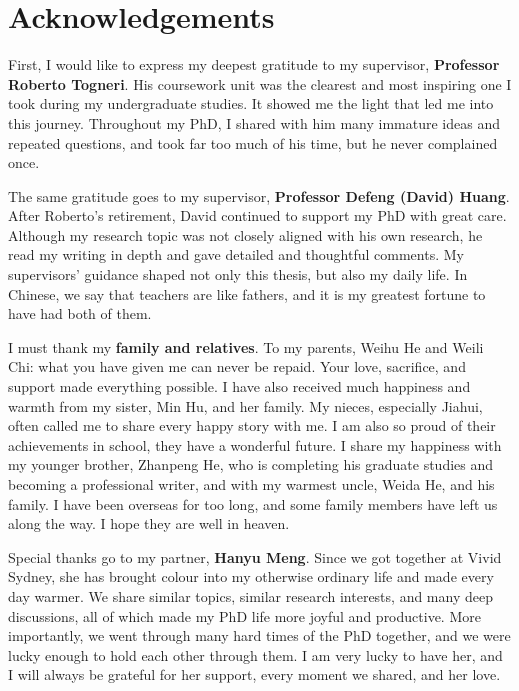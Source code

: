 \chapter*{\Large Acknowledgements}

First, I would like to express my deepest gratitude to my supervisor, \textbf{Professor Roberto Togneri}. His coursework unit was the clearest and most inspiring one I took during my undergraduate studies. It showed me the light that led me into this journey. Throughout my PhD, I shared with him many immature ideas and repeated questions, and took far too much of his time, but he never complained once.

The same gratitude goes to my supervisor, \textbf{Professor Defeng (David) Huang}. After Roberto's retirement, David continued to support my PhD with great care. Although my research topic was not closely aligned with his own research, he read my writing in depth and gave detailed and thoughtful comments. My supervisors' guidance shaped not only this thesis, but also my daily life. In Chinese, we say that teachers are like fathers, and it is my greatest fortune to have had both of them.

I must thank my \textbf{family and relatives}. To my parents, Weihu He and Weili Chi: what you have given me can never be repaid. Your love, sacrifice, and support made everything possible. I have also received much happiness and warmth from my sister, Min Hu, and her family. My nieces, especially Jiahui, often called me to share every happy story with me. I am also so proud of their achievements in school, they have a wonderful future. I share my happiness with my younger brother, Zhanpeng He, who is completing his graduate studies and becoming a professional writer, and with my warmest uncle, Weida He, and his family. I have been overseas for too long, and some family members have left us along the way. I hope they are well in heaven.

Special thanks go to my partner, \textbf{Hanyu Meng}. Since we got together at Vivid Sydney, she has brought colour into my otherwise ordinary life and made every day warmer. We share similar topics, similar research interests, and many deep discussions, all of which made my PhD life more joyful and productive. More importantly, we went through many hard times of the PhD together, and we were lucky enough to hold each other through them. I am very lucky to have her, and I will always be grateful for her support, every moment we shared, and her love.

